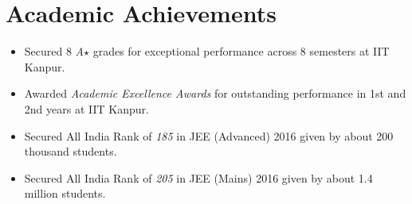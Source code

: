 \section*{Academic Achievements}
\begin{itemize}

\setlength\itemsep{0pt}
\item Secured 8 \textit{A$\star$} grades for exceptional performance across 8 semesters at IIT Kanpur.
\item Awarded \textit{Academic Excellence Awards} for outstanding performance in 1st and 2nd years at IIT Kanpur.
\item Secured All India Rank of \textit{185} in JEE (Advanced) 2016 given by about 200 thousand students.
\item Secured All India Rank of \textit{205} in JEE (Mains) 2016 given by about 1.4 million students.

\end{itemize}
